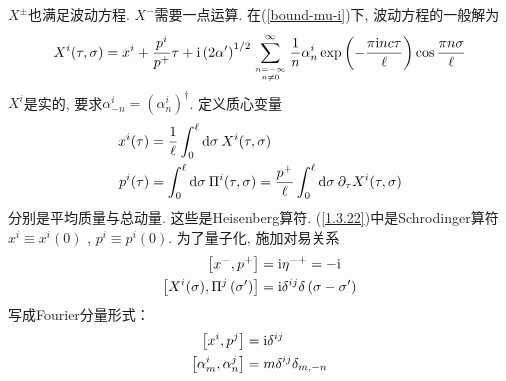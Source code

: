 $X^\pm$也满足波动方程. $X^-$需要一点运算. 在(\ref{bound-mu-i})下, 波动方程的一般解为
\begin{equation}
X^{i}(\tau, \sigma)=x^{i}+\frac{p^{i}}{p^{+}} \tau+\mathrm{i}\left(2 \alpha^{\prime}\right)^{1 / 2} \sum_{n=-\infty \atop n \neq 0}^{\infty} \frac{1}{n} \alpha_{n}^{i} \exp \left(-\frac{\pi \mathrm{i} n c \tau}{\ell}\right) \cos \frac{\pi n \sigma}{\ell} \label{1.3.22}
\end{equation}
$X^i$是实的, 要求$\alpha_{-n}^{i}=\left(\alpha_{n}^{i}\right)^{\dagger}$. 定义质心变量
\begin{subequations}
\begin{align}
x^{i}(\tau)&=\frac{1}{\ell} \int_{0}^{\ell} \mathrm{d} \sigma\: X^{i}(\tau, \sigma) \\
p^{i}(\tau)&=\int_{0}^{\ell} \mathrm{d} \sigma\: \Pi^{i}(\tau, \sigma)=\frac{p^{+}}{\ell} \int_{0}^{\ell} \mathrm{d} \sigma \:\partial_{\tau} X^{i}(\tau, \sigma)
\end{align}
\end{subequations}
分别是平均质量与总动量. 
这些是Heisenberg算符. (\ref{1.3.22})中是Schrodinger算符$x^{i} \equiv x^{i}(0)$ ,  $p^{i} \equiv p^{i}(0)$.
为了量子化, 施加对易关系
\begin{subequations}
\begin{align}
\left[x^{-}, p^{+}\right]&=\mathrm{i} \eta^{-+}=-\mathrm{i}  \label{1.3.24a}\\
\left[X^{i}(\sigma), \Pi^{j}\left(\sigma^{\prime}\right)\right]&=\mathrm{i} \delta^{i j} \delta\left(\sigma-\sigma^{\prime}\right)
\label{1.3.24b}
\end{align}
\end{subequations}
写成Fourier分量形式：
\begin{subequations}
\begin{align}
\left[x^{i}, p^{j}\right]&=\mathrm{i} \delta^{i j}   \label{1.3.25a}\\
\left[\alpha_{m}^{i}, \alpha_{n}^{j}\right]&=m \delta^{i j} \delta_{m,-n}   \label{1.3.25b}
\end{align} \label{1.3.25}
\end{subequations}
